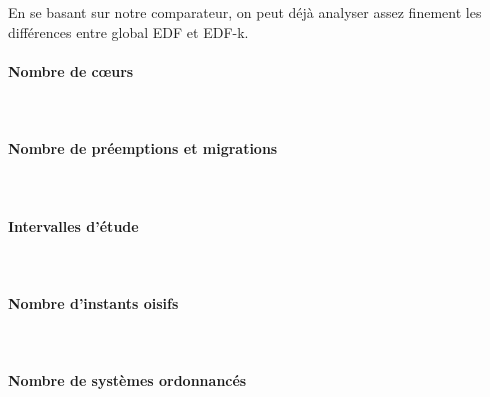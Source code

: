 \documentclass[a4paper,10pt]{article}
\begin{document}
 	En se basant sur notre comparateur, on peut déjà analyser assez finement les différences entre global EDF et EDF-k.\\
	
	\paragraph*{Nombre de cœurs}~\\
		
	\paragraph*{Nombre de préemptions et migrations}~\\

		
	\paragraph*{Intervalles d'étude}~\\
		

	\paragraph*{Nombre d'instants oisifs}~\\
		
	\paragraph*{Nombre de systèmes ordonnancés}~\\
\end{document}
